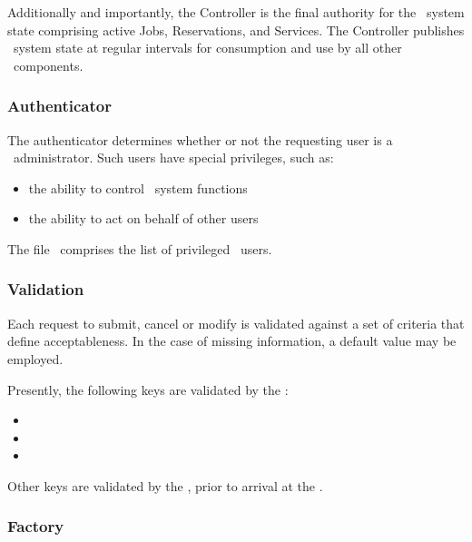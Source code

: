     Additionally and importantly, the Controller is the final authority
    for the \varDUCC~system state comprising active Jobs, Reservations, and 
    Services. The Controller publishes \varDUCC~system state at regular intervals
    for consumption and use by all other \varDUCC~components.
    
    \subsubsection{Authenticator} 
    
    The authenticator determines whether or not the requesting user is a
    \varDUCC~administrator. Such users have special privileges, such as:
    
    \begin{itemize}
      \item the ability to control \varDUCC~system functions
      \item the ability to act on behalf of other users
    \end{itemize}     
    
    The file \varDuccAdministrators~comprises the list of privileged \varDUCC~users.
    
    \subsubsection{Validation} 
    
    Each request to submit, cancel or modify is validated against a set of
    criteria that define acceptableness. In the case of missing information,
    a default value may be employed.
    
    Presently, the following keys are validated by the \varOrchestrator:
    
    \begin{itemize}
      \item \varProcessThreadCount
      \item \varNumberOfInstances
      \item \varSchedulingClass
    \end{itemize} 
    
    Other keys are validated by the \varCommandLineInterface, prior to arrival
    at the \varOrchestrator.
    
    \subsubsection{Factory} 
    
